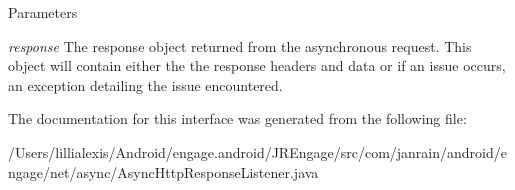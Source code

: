 \begin{DoxyParams}{Parameters}
\item[{\em response}]The response object returned from the asynchronous request. This object will contain either the the response headers and data or if an issue occurs, an exception detailing the issue encountered. \end{DoxyParams}


The documentation for this interface was generated from the following file:\begin{DoxyCompactItemize}
\item 
/Users/lillialexis/Android/engage.android/JREngage/src/com/janrain/android/engage/net/async/AsyncHttpResponseListener.java\end{DoxyCompactItemize}
